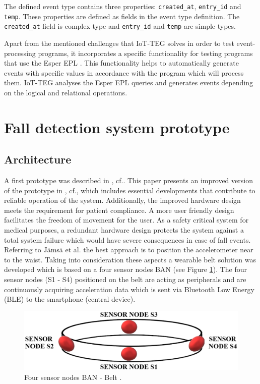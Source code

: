 \documentclass[10pt,journal,compsoc]{IEEEtran}
\begin{document}
The defined event type contains three properties: \texttt{created\_at},
\texttt{entry\_id} and \texttt{temp}. These properties are defined as
fields in the event type definition. The \texttt{created\_at} field is complex
type and \texttt{entry\_id} and \texttt{temp} are simple types. 

Apart from the mentioned challenges that IoT-TEG solves in order to test 
event-processing programs, it incorporates a specific functionality
for testing programs that use the Esper EPL \cite{Esper:2016}. 
This functionality helps to 
automatically generate events with specific values in accordance with the 
program which will process them. IoT-TEG analyses the Esper EPL queries and 
generates events depending on the logical and relational operations. 


\section{Fall detection system prototype}
\label{sec:fall-detectionPrototype}	

\subsection{Architecture}
\label{subsec:Architecture}	
 A first prototype was described in \cite{LaBlunda.2016, LaBlunda.2016b}, cf.\cite{LorenaFall}. This paper presents an improved version of the prototype in \cite{LaBlunda.2016, LaBlunda.2016b}, cf.\cite{LorenaFall}, which includes essential developments that contribute to reliable operation of the system. Additionally, the improved hardware design meets the requirement for patient compliance. A more user friendly design facilitates the freedom of movement for the user. As a safety critical system for medical purposes, a redundant hardware design protects the system against a total system failure which would have severe consequences in case of fall events. Referring to J{\"a}ms{\"a} et al. \cite{jamsa2014fall} the best approach is to position the accelerometer near to the waist. Taking into consideration these aspects a wearable belt solution was developed which is based on a four sensor nodes BAN (see Figure \ref{fig:BanBelt}). The four sensor nodes (S1 - S4) positioned on the belt are acting as peripherals and are continuously acquiring acceleration data which is sent via Bluetooth Low Energy (BLE) to the smartphone (central device). 
\begin{figure}[!ht]
	\centering
	\includegraphics[scale=0.27]{Images/belt.eps}
	\caption[Four sensor nodes BAN - Belt]{Four sensor nodes BAN - Belt \cite{LaBlunda.2016, LaBlunda.2016b}.}
	\label{fig:BanBelt}
\end{figure}
\end{document}
